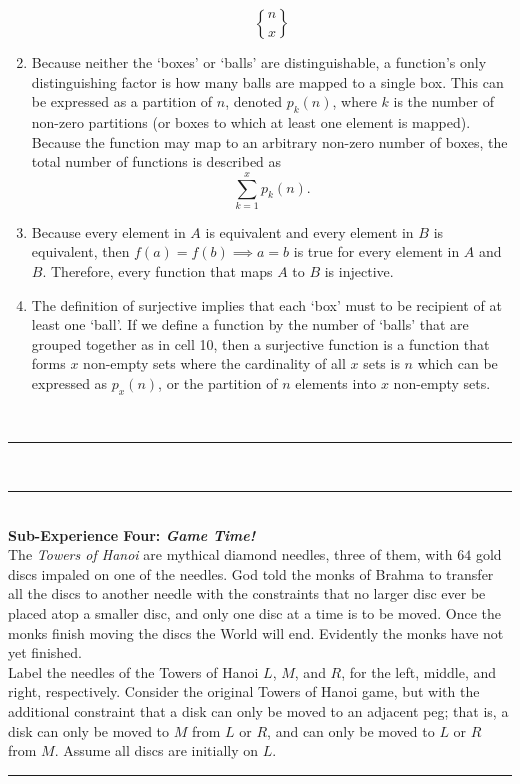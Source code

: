 \documentclass{article}
\newcommand{\problemsep}{\leavevmode\\[0.05in] \rule[\baselineskip/4]{\textwidth}{1pt} \\[0.005in] \rule[\baselineskip]{\textwidth}{1pt}\vspace{-\baselineskip/2}\leavevmode\\[0.05in]}
\newcommand{\statementsep}{\leavevmode\\[0.005in] \rule[\baselineskip/4]{\textwidth}{0.4pt}\leavevmode\\[0.005in]}
\begin{document}
\begin{enumerate}
	\begin{equation*}
		{n \brace x}
	\end{equation*}
\item Because neither the `boxes' or `balls' are distinguishable, a function's only distinguishing factor is how many balls are mapped to a single box. This can be expressed as a partition of $n$, denoted $p_k(n)$, where $k$ is the number of non-zero partitions (or boxes to which at least one element is mapped). Because the function may map to an arbitrary non-zero number of boxes, the total number of functions is described as
	\begin{equation*}
		\sum_{k=1}^x p_k(n).
	\end{equation*}
\item Because every element in $A$ is equivalent and every element in $B$ is equivalent, then $f(a) = f(b) \implies a = b$ is true for every element in $A$ and $B$. Therefore, every function that maps $A$ to $B$ is injective.
\item The definition of surjective implies that each `box' must to be recipient of at least one `ball'. If we define a function by the number of `balls' that are grouped together as in cell 10, then a surjective function is a function that forms $x$ non-empty sets where the cardinality of all $x$ sets is $n$ which can be expressed as $p_x(n)$, or the partition of $n$ elements into $x$ non-empty sets.
\end{enumerate}
\problemsep
\noindent \maltese \hspace{1ex} {\bf Sub-Experience Four: \emph{Game Time!}}\\
  The \emph{Towers of Hanoi} are 
mythical diamond needles, three of them, with $64$ gold discs impaled on one of the
needles.  God told the monks of Brahma to transfer all the discs to another needle 
with the constraints that no larger disc ever be placed atop a smaller disc, and 
only one disc at a time is to be moved.  Once the monks finish moving the discs the
World will end.  Evidently the monks have not yet finished. \\
\noindent Label the needles of the Towers of Hanoi $L$, $M$,
and $R$, for the left, middle, and right, respectively.
Consider the original Towers of Hanoi game,
but with the additional constraint that a disk can only be moved to an adjacent 
peg; that is, a disk can only be moved to $M$ from $L$ or $R$, and can only be 
moved to $L$ or $R$ from $M$.
Assume all discs are initially on $L$.
\statementsep
\end{document}
